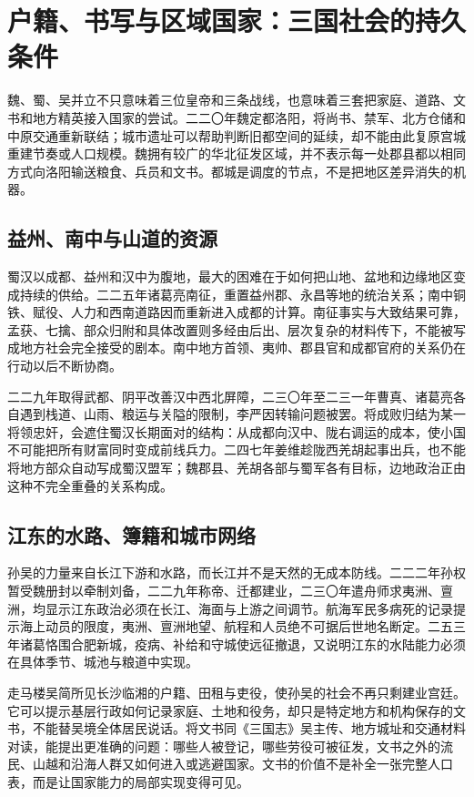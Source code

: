\section{户籍、书写与区域国家：三国社会的持久条件}
\label{sec:three-kingdoms-households-culture-statecraft}

魏、蜀、吴并立不只意味着三位皇帝和三条战线，也意味着三套把家庭、道路、文书和地方精英接入国家的尝试。二二〇年魏定都洛阳，将尚书、禁军、北方仓储和中原交通重新联结；城市遗址可以帮助判断旧都空间的延续，却不能由此复原宫城重建节奏或人口规模。魏拥有较广的华北征发区域，并不表示每一处郡县都以相同方式向洛阳输送粮食、兵员和文书。都城是调度的节点，不是把地区差异消失的机器。

\subsection{益州、南中与山道的资源}

蜀汉以成都、益州和汉中为腹地，最大的困难在于如何把山地、盆地和边缘地区变成持续的供给。二二五年诸葛亮南征，重置益州郡、永昌等地的统治关系；南中铜铁、赋役、人力和西南道路因而重新进入成都的计算。南征事实与大致结果可靠，孟获、七擒、部众归附和具体改置则多经由后出、层次复杂的材料传下，不能被写成地方社会完全接受的剧本。南中地方首领、夷帅、郡县官和成都官府的关系仍在行动以后不断协商。

二二九年取得武都、阴平改善汉中西北屏障，二三〇年至二三一年曹真、诸葛亮各自遇到栈道、山雨、粮运与关隘的限制，李严因转输问题被罢。将成败归结为某一将领忠奸，会遮住蜀汉长期面对的结构：从成都向汉中、陇右调运的成本，使小国不可能把所有财富同时变成前线兵力。二四七年姜维趁陇西羌胡起事出兵，也不能将地方部众自动写成蜀汉盟军；魏郡县、羌胡各部与蜀军各有目标，边地政治正由这种不完全重叠的关系构成。

\subsection{江东的水路、簿籍和城市网络}

孙吴的力量来自长江下游和水路，而长江并不是天然的无成本防线。二二二年孙权暂受魏册封以牵制刘备，二二九年称帝、迁都建业，二三〇年遣舟师求夷洲、亶洲，均显示江东政治必须在长江、海面与上游之间调节。航海军民多病死的记录提示海上动员的限度，夷洲、亶洲地望、航程和人员绝不可据后世地名断定。二五三年诸葛恪围合肥新城，疫病、补给和守城使远征撤退，又说明江东的水陆能力必须在具体季节、城池与粮道中实现。

走马楼吴简所见长沙临湘的户籍、田租与吏役，使孙吴的社会不再只剩建业宫廷。它可以提示基层行政如何记录家庭、土地和役务，却只是特定地方和机构保存的文书，不能替吴境全体居民说话。将文书同《三国志》吴主传、地方城址和交通材料对读，能提出更准确的问题：哪些人被登记，哪些劳役可被征发，文书之外的流民、山越和沿海人群又如何进入或逃避国家。文书的价值不是补全一张完整人口表，而是让国家能力的局部实现变得可见。

